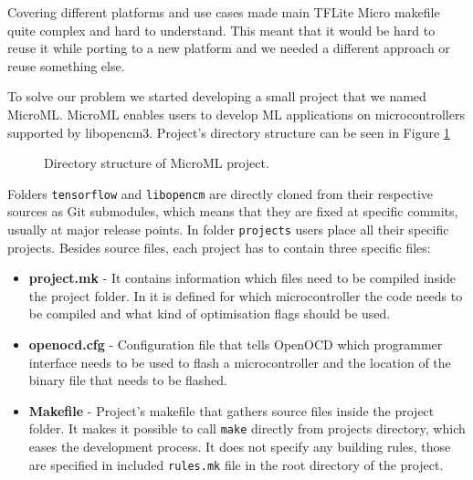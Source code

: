 Covering different platforms and use cases made main TFLite Micro makefile quite complex and hard to understand.
This meant that it would be hard to reuse it while porting to a new platform and we needed a different approach or reuse something else.

To solve our problem we started developing a small project that we named MicroML\footnotemark.
MicroML enables users to develop ML applications on microcontrollers supported by libopencm3.
Project's directory structure can be seen in Figure \ref{microml_dir}


\begin{figure}[ht] 
    \centering
    \begin{minipage}{7cm}
    \end{minipage}
    \caption{ Directory structure of MicroML project.}
    \label{microml_dir}
\end{figure}

Folders \verb|tensorflow| and \verb|libopencm| are directly cloned from their respective sources as Git submodules, which means that they are fixed at specific commits, usually at major release points.
In folder \verb|projects| users place all their specific projects.
Besides source files, each project has to contain three specific files:

\begin{itemize}
    \item \textbf{project.mk} - It contains information which files need to be compiled inside the project folder. In it is defined for which microcontroller the code needs to be compiled and what kind of optimisation flags should be used.
    \item \textbf{openocd.cfg} - Configuration file that tells OpenOCD which programmer interface needs to be used to flash a microcontroller and the location of the binary file that needs to be flashed.
    \item \textbf{Makefile} - Project's makefile that gathers source files inside the project folder. It makes it possible to call \verb|make| directly from projects directory, which eases the development process. It does not specify any building rules, those are specified in included \verb|rules.mk| file in the root directory of the project.
\end{itemize}

